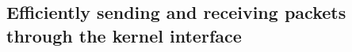 \documentclass[11pt,a4paper,british]{bhamarticle}
\begin{document}
\subsection{Efficiently sending and receiving packets through the kernel interface}
\cite{tpacket} %

\printbibliography %
\end{document}
